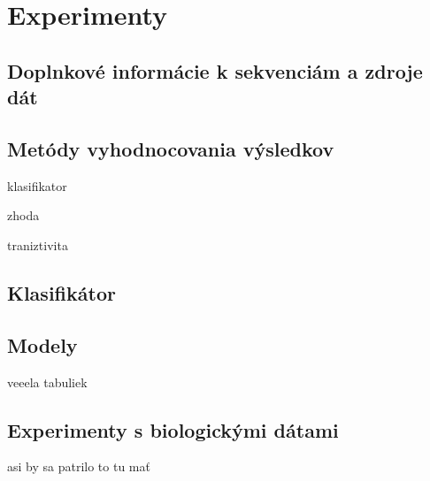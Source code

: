 \chapter{Experimenty}

\section{Doplnkové informácie k sekvenciám a zdroje dát}

\section{Metódy vyhodnocovania výsledkov}

\todo klasifikator

\todo zhoda

\todo traniztivita

\section{Klasifikátor}

\section{Modely}

\todo veeela tabuliek

\section{Experimenty s biologickými dátami}

\todo asi by sa patrilo to tu mať
